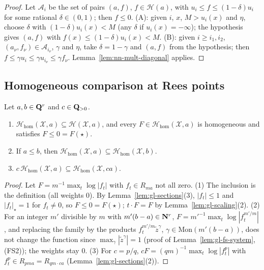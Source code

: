 \begin{proof}
Let $\mathcal A_i$ be the set of pairs $(a,f)$, $f\in\mathcal H(a)$, with $u_i\le f\le(1-\delta)u_i$ for some rational $\delta\in(0,1)$; then
$f\le0$. (A): given $i$, $x$, $M>u_i(x)$ and $\eta$, choose $\delta$ with $(1-\delta)u_i(x)<M$ (any $\delta$ if $u_i(x)=-\infty$); the hypothesis gives
$(a,f)$ with $f(x)\le(1-\delta)u_i(x)<M$. (B): given $i\ge i_1,i_2$, $(a_\nu,f_\nu)\in\mathcal A_{i_\nu}$, $\gamma$ and $\eta$, take $\delta=1-\gamma$ and
$(a,f)$ from the hypothesis; then $f\le\gamma u_i\le\gamma u_{i_\nu}\le\gamma f_\nu$. Lemma~\ref{lem:nn-mult-diagonal} applies.
\end{proof}

\subsection{Homogeneous comparison at Rees points}\label{subsec:nn-shilov}

\begin{lemma}\label{lem:nn-hom-fs-operations}
\leanok
{}
Let $a,b\in\mathbf{Q}^r$ and $c\in\mathbf{Q}_{>0}$.
\begin{enumerate}
\item $\mathcal H_{\mathrm{hom}}(\mathcal X,a)\subseteq\mathcal H(\mathcal X,a)$, and every $F\in\mathcal H_{\mathrm{hom}}(\mathcal X,a)$ is homogeneous and
satisfies $F\le0=F(\star)$.
\item If $a\le b$, then $\mathcal H_{\mathrm{hom}}(\mathcal X,a)\subseteq\mathcal H_{\mathrm{hom}}(\mathcal X,b)$.
\item $c\,\mathcal H_{\mathrm{hom}}(\mathcal X,a)\subseteq\mathcal H_{\mathrm{hom}}(\mathcal X,ca)$.
\end{enumerate}
\end{lemma}

\begin{proof}
Let $F=m^{-1}\max_t\log|f_t|$ with $f_t\in R_{ma}$ not all zero. (1) The inclusion is the definition (all weights $0$). By
Lemma~\ref{lem:gl-sections}(3), $|f_t|\le1$ and $|f_t|_\star=1$ for $f_t\ne0$, so $F\le0=F(\star)$; $t\cdot F=F$ by
Lemma~\ref{lem:gl-scaling}(2). (2) For an integer $m'$ divisible by $m$ with $m'(b-a)\in\mathbf{N}^r$,
$F=m'^{-1}\max_t\log|f_t^{m'/m}|$, and replacing the family by the products $f_t^{m'/m}\tilde z^\gamma$, $\gamma\in\mathrm{Mon}(m'(b-a))$, does not
change the function since $\max_\gamma|\tilde z^\gamma|=1$ (proof of Lemma~\ref{lem:gl-fs-system}, (FS2)); the weights stay $0$. (3) For
$c=p/q$, $cF=(qm)^{-1}\max_t\log|f_t^p|$ with $f_t^p\in R_{pma}=R_{qm\cdot ca}$ (Lemma~\ref{lem:gl-sections}(2)).
\end{proof}

